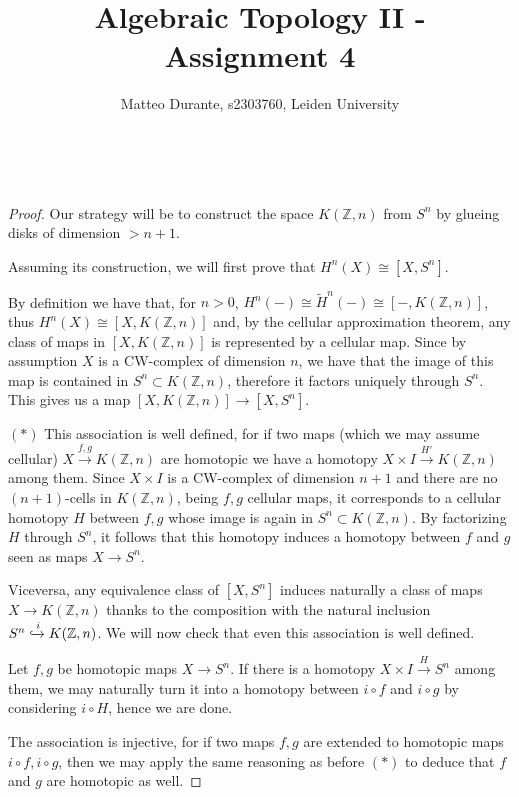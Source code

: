 \documentclass{article}
\newcommand{\numberset}{\mathbb}
\newcommand{\Z}{\numberset{Z}}
\newcommand{\exercise}[1]{\noindent {\bf Exercise #1}}
\begin{document}
\title{Algebraic Topology II - Assignment 4}

\author{Matteo Durante, s2303760, Leiden University}

\maketitle


~\\
\exercise{3}

\begin{proof}
    Our strategy will be to construct the space $K(\Z,n)$ from $S^n$ by glueing
    disks of dimension $>n+1$.
    
    Assuming its construction, we will first prove that $H^n(X)\cong[X,S^n]$.
    
    By definition we have that, for $n>0$,
    $H^n(-)\cong \tilde{H}^n(-)\cong [-,K(\Z,n)]$, thus $H^n(X)\cong[X,K(\Z,n)]$
    and, by the cellular
    approximation theorem, any class of maps in $[X,K(\Z,n)]$ is represented by
    a cellular map. Since by assumption $X$ is a CW-complex of dimension $n$, we
    have that the image of this map is contained in $S^n\subset K(\Z,n)$,
    therefore it factors uniquely through $S^n$. This gives us a map
    $[X,K(\Z,n)]\rightarrow[X,S^n]$.
    
    $(*)$ This association is well defined, for if two maps (which we may assume
    cellular) $X\xrightarrow{f,g}K(\Z,n)$ are homotopic we have a homotopy $X\times I
    \xrightarrow{H'} K(\Z,n)$ among them. Since $X\times I$ is a CW-complex of
    dimension $n+1$ and there are no
    $(n+1)$-cells in $K(\Z,n)$, being $f,g$ cellular maps, it corresponds to a
    cellular homotopy $H$ between $f,g$ whose image is again in $S^n\subset
    K(\Z,n)$. By factorizing $H$ through $S^n$, it follows that this homotopy
    induces a homotopy between $f$ and $g$ seen as maps $X\rightarrow S^n$.

    Viceversa, any equivalence class of $[X,S^n]$ induces naturally a
    class of maps $X\rightarrow K(\Z,n)$ thanks to the composition with the
    natural inclusion $S^n\xhookrightarrow{i} K(\Z,n)$. We will now check that
    even this association is well defined.
    
    Let $f,g$ be homotopic maps $X\rightarrow S^n$. If there is a homotopy
    $X\times I\xrightarrow{H}S^n$ among them, we
    may naturally turn it into a homotopy between $i\circ f$ and $i\circ g$ by
    considering $i\circ H$, hence we are done.

    The association is injective, for if two maps $f,g$ are extended to
    homotopic maps $i\circ f,i\circ g$, then we may apply the same reasoning as
    before $(*)$ to deduce that $f$ and $g$ are homotopic as well.


\end{proof}
\end{document}
